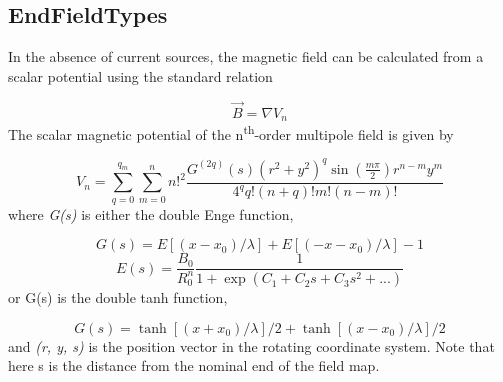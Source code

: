 \subsection{EndFieldTypes}
In the absence of current sources, the magnetic field can be calculated from a scalar potential using the standard
relation

\begin{equation*}
\vec B=\nabla V_n
\end{equation*}
The scalar magnetic potential of the n\textsuperscript{th}{}-order multipole field is given by

\begin{equation*}
V_n=\sum _{q=0}^{q_m}\sum _{m=0}^nn!^2\frac{G^{(2q)}(s)(r^2+y^2)^q\sin (\frac{m\pi } 2)r^{n-m}y^m}{4^qq!(n+q)!m!(n-m)!}
\end{equation*}
where \textit{G(s)} is either the double Enge function,

\begin{equation*}
G(s)=E[(x-x_0)/\lambda ]+E[(-x-x_0)/\lambda ]-1
\end{equation*}
\begin{equation*}
E(s)=\frac{B_0}{R_0^n}\frac 1{1+\exp (C_1+C_2s+C_3s^2+...)}
\end{equation*}
or G(s) is the double tanh function,

\begin{equation*}
G(s)=\tanh [(x+x_0)/\lambda ]/2+\tanh [(x-x_0)/\lambda ]/2
\end{equation*}
and \textit{(r, y, s)} is the position vector in the rotating coordinate system. Note that here s is the distance from
the nominal end of the field map.

